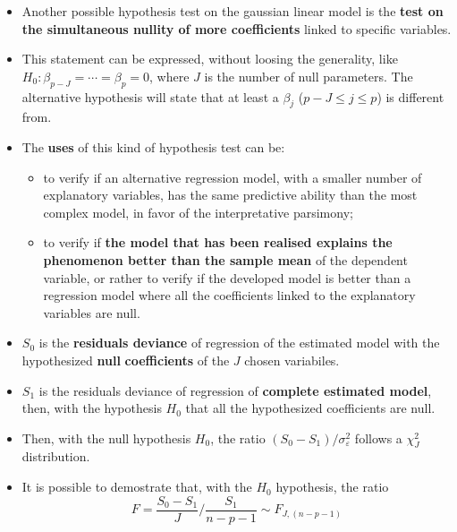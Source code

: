 
\begin{frame}
  \vspace{-0.10cm}
  \begin{itemize}
    \item Another possible hypothesis test on the gaussian linear model is the \textbf{test on the simultaneous nullity of more coefficients} linked to specific variables. 
    \item This statement can be expressed, without loosing the generality, like $H_0:\beta_{p-J}=\cdots=\beta_p=0$, where $J$ is the number of null parameters. The alternative hypothesis will state that at least a $\beta_j$ ($p-J\leqslant j\leqslant p$) is different from.
    \item The \textbf{uses} of this kind of hypothesis test can be:
    \begin{itemize}
      \item to verify if an alternative regression model, with a smaller number of explanatory variables, has the same predictive ability than the most complex model, in favor of the interpretative parsimony;
      \item to verify if \textbf{the model that has been realised explains the phenomenon better than the sample mean} of the dependent variable, or rather to verify if the developed model is better than a regression model where all the coefficients linked to the explanatory variables are null.
    \end{itemize}
  \end{itemize}
\end{frame}

\begin{frame}
  \vspace*{.25cm}
  \begin{itemize}
    \item $ S_{0} $ is the \textbf{residuals deviance} of regression of the estimated model with the hypothesized \textbf{null} \textbf{coefficients} of the $ J $ chosen variabiles.
    \vspace*{.25cm}
    \item $ S_{1} $ is the residuals deviance of regression of \textbf{complete estimated model}, then, with the hypothesis $ H_0 $ that all the hypothesized coefficients are null.
    \vspace*{.25cm}
    \item Then, with the null hypothesis $ H_0 $, the ratio $ {(S_0-S_1)}/{\sigma^2_{\varepsilon}} $ follows a $ \chi^2_{J} $ distribution.
    \vspace*{.25cm}
    \item It is possible to demostrate that, with the $ H_0 $ hypothesis, the ratio 
      $$ F = \frac{S_0-S_1}{J}/{\frac{S_1}{n-p-1}} \sim F_{J, (n-p-1)} $$ \\
  \end{itemize}
\end{frame}


